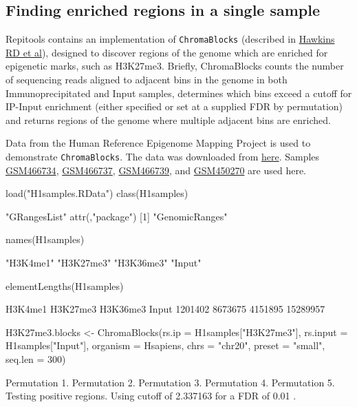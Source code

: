 \subsection{Finding enriched regions in a single sample}
Repitools contains an implementation of \texttt{ChromaBlocks} (described in \href{http://www.ncbi.nlm.nih.gov/pubmed/20452322}{Hawkins RD et al}), designed to discover regions of the genome which are enriched for epigenetic marks, such as H3K27me3.  Briefly, ChromaBlocks counts the number of sequencing reads aligned to adjacent bins in the genome in both Immunoprecipitated and Input samples, determines which bins exceed a cutoff for IP-Input enrichment (either specified or set at a supplied FDR by permutation) and returns regions of the genome where multiple adjacent bins are enriched.

\noindent Data from the Human Reference Epigenome Mapping Project is used to demonstrate \texttt{ChromaBlocks}. The data was downloaded from \href{http://www.ncbi.nlm.nih.gov/geo/query/acc.cgi?acc=GSE16256}{here}. Samples \href{http://www.ncbi.nlm.nih.gov/geo/query/acc.cgi?acc=GSM466734}{GSM466734}, \href{http://www.ncbi.nlm.nih.gov/geo/query/acc.cgi?acc=GSM466737}{GSM466737}, \href{http://www.ncbi.nlm.nih.gov/geo/query/acc.cgi?acc=GSM466739}{GSM466739}, and \href{http://www.ncbi.nlm.nih.gov/projects/geo/query/acc.cgi?acc=GSM450270}{GSM450270} are used here.

\begin{Schunk}
\begin{Sinput}
 load("H1samples.RData")
 class(H1samples)
\end{Sinput}
\begin{Soutput}
[1] "GRangesList"
attr(,"package")
[1] "GenomicRanges"
\end{Soutput}
\begin{Sinput}
 names(H1samples)
\end{Sinput}
\begin{Soutput}
[1] "H3K4me1"  "H3K27me3" "H3K36me3" "Input"   
\end{Soutput}
\begin{Sinput}
 elementLengths(H1samples)
\end{Sinput}
\begin{Soutput}
 H3K4me1 H3K27me3 H3K36me3    Input 
 1201402  8673675  4151895 15289957 
\end{Soutput}
\begin{Sinput}
 H3K27me3.blocks <- ChromaBlocks(rs.ip = H1samples["H3K27me3"], 
     rs.input = H1samples["Input"], organism = Hsapiens, chrs = "chr20", 
     preset = "small", seq.len = 300)
\end{Sinput}
\begin{Soutput}
Permutation 1.
Permutation 2.
Permutation 3.
Permutation 4.
Permutation 5.
Testing positive regions.
Using cutoff of 2.337163 for a FDR of 0.01 
.
\end{Soutput}
\end{Schunk}

